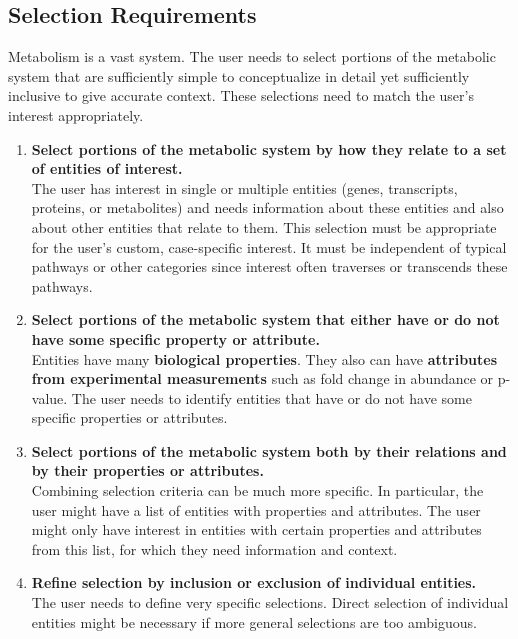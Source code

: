 

\subsection{Selection Requirements}
Metabolism is a vast system.
The user needs to select portions of the metabolic system that are sufficiently simple to conceptualize in detail yet sufficiently inclusive to give accurate context.
These selections need to match the user's interest appropriately.

\begin{enumerate}

\item \textbf{Select portions of the metabolic system by how they relate to a set of entities of interest.}
\\
The user has interest in single or multiple entities (genes, transcripts, proteins, or metabolites) and needs information about these entities and also about other entities that relate to them.
This selection must be appropriate for the user's custom, case-specific interest.
It must be independent of typical pathways or other categories since interest often traverses or transcends these pathways.

\item \textbf{Select portions of the metabolic system that either have or do not have some specific property or attribute.}
\\
Entities have many \textbf{biological properties}.
They also can have \textbf{attributes from experimental measurements} such as fold change in abundance or p-value.
The user needs to identify entities that have or do not have some specific properties or attributes.

\item \textbf{Select portions of the metabolic system both by their relations and by their properties or attributes.}
\\
Combining selection criteria can be much more specific.
In particular, the user might have a list of entities with properties and attributes.
The user might only have interest in entities with certain properties and attributes from this list, for which they need information and context.

\item \textbf{Refine selection by inclusion or exclusion of individual entities.}
\\
The user needs to define very specific selections.
Direct selection of individual entities might be necessary if more general selections are too ambiguous.

\end{enumerate}


